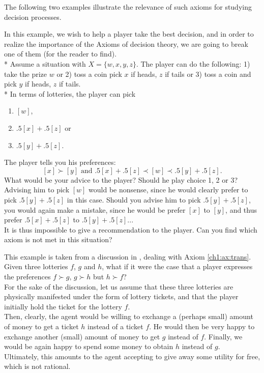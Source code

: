 The following two examples illustrate the relevance of such axioms for studying decision processes.
\begin{example}
\label{ch1:nosubs}
In this example, we wish to help a player take the best decision, and in order to realize the importance of the Axioms of decision theory, we are going to break one of them (for the reader to find).  \\*
Assume a situation with $X = \{w,x,y,z\}$.
The player can do the following: 1) take the prize $w$ or 2) toss a coin  pick $x$ if heads, $z$ if tails or 3) toss a coin and pick  $y$ if heads, $z$ if tails.\\*
In terms of lotteries, the player can pick
\begin{enumerate}
\item $[w]$,
\item $.5[x]+.5[z]$ or
\item $.5[y]+.5[z]$.
\end{enumerate}
The player tells you his preferences:
$$[x] \succ [y] \text{ and } .5[x]+.5[z] \prec [w] \prec.5[y]+.5[z].$$
What would be your advice to the player? Should he play choice 1, 2 or 3?\\
Advising him to pick $[w]$ would be nonsense, since he would clearly prefer to pick $.5[y]+.5[z]$ in this case. Should you advise him to pick $.5[y]+.5[z]$, you would again make a mistake, since he would be prefer $[x]$ to $[y]$, and thus prefer $.5[x]+.5[z]$ to $.5[y]+.5[z]$...\\
It is thus impossible to give a recommendation to the player. Can you find which axiom is not met in this situation?
\end{example}

\begin{example}
\label{ch1:otherExa}
This example is taken from a discussion in \cite[Chapter 3]{ShLeMSAG}, dealing with Axiom \ref{ch1:ax:trans}.
Given three lotteries $f$, $g$ and $h$, what if it were the case that a player expresses the preferences $f \succ g, \, g \succ h$ but $h \succ f$? \\
For the sake of the discussion, let us assume that these three lotteries are physically manifested under the form of lottery tickets, and that the player initially hold the ticket for the lottery $f$. \\
Then, clearly, the agent would be willing to exchange a (perhaps small) amount of money to get a ticket $h$ instead of a ticket $f$. He would then be very happy to exchange another (small) amount of money to get $g$ instead of $f$. Finally, we would be again happy to spend some money to obtain $h$ instead of $g$.\\
Ultimately, this amounts to the agent accepting to give away some utility for free, which is not rational.

\end{example}

